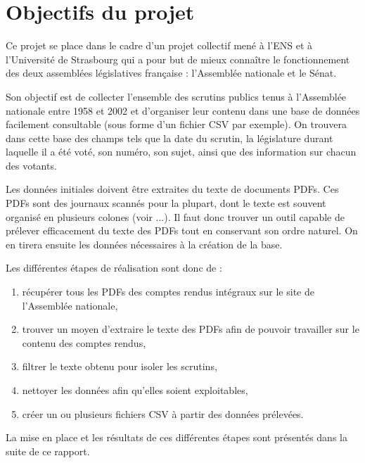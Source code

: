 \section{Objectifs du projet}

Ce projet se place dans le cadre d'un projet collectif mené à l'ENS et à l'Université de Strasbourg qui a pour but de mieux connaître le fonctionnement des deux assemblées législatives française : l'Assemblée nationale et le Sénat.

Son objectif est de collecter l'ensemble des scrutins publics tenus à l'Assemblée nationale entre 1958 et 2002 et d'organiser leur contenu dans une base de données facilement consultable (sous forme d'un fichier CSV par exemple). On trouvera dans cette base des champs tels que la date du scrutin, la législature durant laquelle il a été voté, son numéro, son sujet, ainsi que des information sur chacun des votants.

Les données initiales doivent être extraites du texte de documents PDFs. Ces PDFs sont des journaux scannés pour la plupart, dont le texte est souvent organisé en plusieurs colones (voir ...). Il faut donc trouver un outil capable de prélever efficacement du texte des PDFs tout en conservant son ordre naturel. On en tirera ensuite les données nécessaires à la création de la base.


Les différentes étapes de réalisation sont donc de :
\begin{enumerate}
\item récupérer tous les PDFs des comptes rendus intégraux sur le site de l'Assemblée nationale,
\item trouver un moyen d'extraire le texte des PDFs afin de pouvoir travailler sur le contenu des comptes rendus,
\item filtrer le texte obtenu pour isoler les scrutins,
\item nettoyer les données afin qu'elles soient exploitables,
\item créer un ou plusieurs fichiers CSV à partir des données prélevées.
\end{enumerate}

\vspace{0.3cm}
La mise en place et les résultats de ces différentes étapes sont présentés dans la suite de ce rapport.
